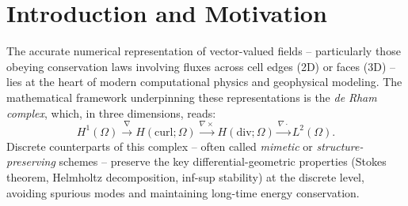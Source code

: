 %
%
%
%
%
%
%

\section{Introduction and Motivation}

The accurate numerical representation of vector-valued fields -- particularly
those obeying conservation laws involving fluxes across cell edges (2D) or
faces (3D) -- lies at the heart of modern computational physics and geophysical
modeling. The mathematical framework underpinning these representations is the
\emph{de Rham complex}, which, in three dimensions, reads:
\[
  H^1(\Omega) \xrightarrow{\nabla} H(\mathrm{curl};\Omega)
             \xrightarrow{\nabla\times} H(\mathrm{div};\Omega)
             \xrightarrow{\nabla\cdot} L^2(\Omega).
\]
Discrete counterparts of this complex -- often called \emph{mimetic} or
\emph{structure-preserving} schemes -- preserve the key differential-geometric
properties (Stokes theorem, Helmholtz decomposition, inf-sup stability) at the
discrete level, avoiding spurious modes and maintaining long-time energy
conservation.

